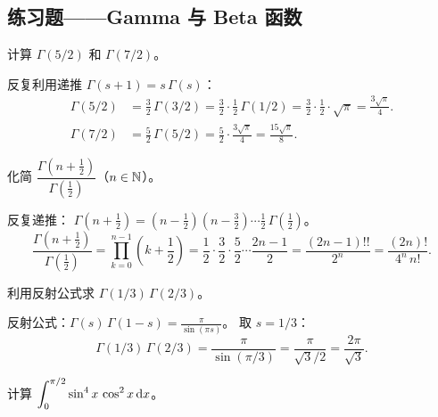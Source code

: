 \documentclass{ctexart}
\begin{document}
\subsection{练习题——Gamma 与 Beta 函数}

\begin{exercise}
  计算 $\Gamma(5/2)$ 和 $\Gamma(7/2)$。
\end{exercise}

\begin{solution}
  反复利用递推 $\Gamma(s+1) = s\,\Gamma(s)$：
  \begin{align*}
    \Gamma(5/2) &= \frac{3}{2}\,\Gamma(3/2)
    = \frac{3}{2}\cdot\frac{1}{2}\,\Gamma(1/2)
    = \frac{3}{2}\cdot\frac{1}{2}\cdot\sqrt{\pi}
    = \frac{3\sqrt{\pi}}{4}. \\
    \Gamma(7/2) &= \frac{5}{2}\,\Gamma(5/2)
    = \frac{5}{2}\cdot\frac{3\sqrt{\pi}}{4}
    = \frac{15\sqrt{\pi}}{8}.
  \end{align*}
\end{solution}

\begin{exercise}[利用递推化简]
  化简 $\dfrac{\Gamma(n+\frac{1}{2})}{\Gamma(\frac{1}{2})}$（$n \in \mathbb{N}$）。
\end{exercise}

\begin{solution}
  反复递推：
  $\Gamma(n+\frac{1}{2}) = (n-\frac{1}{2})(n-\frac{3}{2})\cdots\frac{1}{2}\,\Gamma(\frac{1}{2})$。
  \[
    \frac{\Gamma(n+\frac{1}{2})}{\Gamma(\frac{1}{2})}
    = \prod_{k=0}^{n-1}\left(k+\frac{1}{2}\right)
    = \frac{1}{2}\cdot\frac{3}{2}\cdot\frac{5}{2}\cdots\frac{2n-1}{2}
    = \frac{(2n-1)!!}{2^n}
    = \frac{(2n)!}{4^n\,n!}.
  \]
\end{solution}

\begin{exercise}[反射公式应用]
  利用反射公式求 $\Gamma(1/3)\,\Gamma(2/3)$。
\end{exercise}

\begin{solution}
  反射公式：$\Gamma(s)\,\Gamma(1-s) = \frac{\pi}{\sin(\pi s)}$。
  取 $s = 1/3$：
  \[
    \Gamma(1/3)\,\Gamma(2/3) = \frac{\pi}{\sin(\pi/3)} = \frac{\pi}{\sqrt{3}/2} = \frac{2\pi}{\sqrt{3}}.
  \]
\end{solution}

\begin{exercise}
  计算 $\displaystyle\int_0^{\pi/2}\sin^4 x\,\cos^2 x\,\mathrm{d} x$。
\end{exercise}
\end{document}

